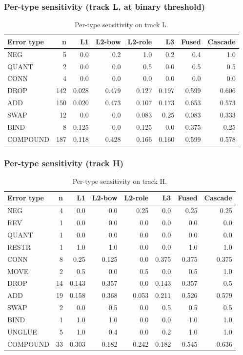 \documentclass[11pt,letterpaper]{article}
\begin{document}
\subsubsection{Per-type sensitivity (track L, at binary threshold)}

\begin{table}[!htbp]
\centering
\caption{Per-type sensitivity on track L.}
\label{tab:pertype_trackl}
\begin{tabular}{lrrrrrrr}
\toprule
Error type & n & L1 & L2-bow & L2-role & L3 & Fused & Cascade \\
\midrule
NEG & 5 & 0.0 & 0.2 & 1.0 & 0.2 & 0.4 & 1.0 \\
QUANT & 2 & 0.0 & 0.0 & 0.5 & 0.0 & 0.5 & 0.5 \\
CONN & 4 & 0.0 & 0.0 & 0.0 & 0.0 & 0.0 & 0.0 \\
DROP & 142 & 0.028 & 0.479 & 0.127 & 0.197 & 0.599 & 0.606 \\
ADD & 150 & 0.020 & 0.473 & 0.107 & 0.173 & 0.653 & 0.573 \\
SWAP & 12 & 0.0 & 0.0 & 0.083 & 0.25 & 0.083 & 0.333 \\
BIND & 8 & 0.125 & 0.0 & 0.125 & 0.0 & 0.375 & 0.25 \\
COMPOUND & 187 & 0.118 & 0.428 & 0.166 & 0.160 & 0.599 & 0.578 \\
\bottomrule
\end{tabular}
\end{table}

\subsubsection{Per-type sensitivity (track H)}

\begin{table}[!htbp]
\centering
\caption{Per-type sensitivity on track H.}
\label{tab:pertype_trackh}
\begin{tabular}{lrrrrrrr}
\toprule
Error type & n & L1 & L2-bow & L2-role & L3 & Fused & Cascade \\
\midrule
NEG & 4 & 0.0 & 0.0 & 0.25 & 0.0 & 0.25 & 0.25 \\
REV & 1 & 0.0 & 0.0 & 0.0 & 0.0 & 0.0 & 0.0 \\
QUANT & 1 & 0.0 & 0.0 & 0.0 & 0.0 & 0.0 & 0.0 \\
RESTR & 1 & 1.0 & 1.0 & 0.0 & 0.0 & 1.0 & 1.0 \\
CONN & 8 & 0.25 & 0.125 & 0.0 & 0.375 & 0.375 & 0.375 \\
MOVE & 2 & 0.5 & 0.0 & 0.5 & 0.0 & 0.5 & 1.0 \\
DROP & 14 & 0.143 & 0.357 & 0.0 & 0.143 & 0.357 & 0.5 \\
ADD & 19 & 0.158 & 0.368 & 0.053 & 0.211 & 0.526 & 0.579 \\
SWAP & 2 & 0.0 & 0.5 & 0.0 & 0.5 & 0.5 & 0.5 \\
BIND & 1 & 1.0 & 1.0 & 0.0 & 0.0 & 1.0 & 1.0 \\
UNGLUE & 5 & 1.0 & 0.4 & 0.0 & 0.2 & 1.0 & 1.0 \\
COMPOUND & 33 & 0.303 & 0.182 & 0.242 & 0.182 & 0.545 & 0.636 \\
\bottomrule
\end{tabular}
\end{table}
\end{document}
